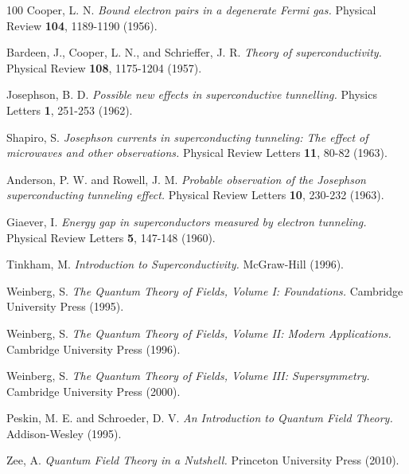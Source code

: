 \documentclass[11pt]{article}
\theoremstyle{definition}
\begin{document}
\begin{thebibliography}{100}
Cooper, L. N.
\textit{Bound electron pairs in a degenerate Fermi gas.}
Physical Review \textbf{104}, 1189-1190 (1956).

Bardeen, J., Cooper, L. N., and Schrieffer, J. R.
\textit{Theory of superconductivity.}
Physical Review \textbf{108}, 1175-1204 (1957).

Josephson, B. D.
\textit{Possible new effects in superconductive tunnelling.}
Physics Letters \textbf{1}, 251-253 (1962).

Shapiro, S.
\textit{Josephson currents in superconducting tunneling: The effect of microwaves and other observations.}
Physical Review Letters \textbf{11}, 80-82 (1963).

Anderson, P. W. and Rowell, J. M.
\textit{Probable observation of the Josephson superconducting tunneling effect.}
Physical Review Letters \textbf{10}, 230-232 (1963).

Giaever, I.
\textit{Energy gap in superconductors measured by electron tunneling.}
Physical Review Letters \textbf{5}, 147-148 (1960).

Tinkham, M.
\textit{Introduction to Superconductivity.}
McGraw-Hill (1996).

Weinberg, S.
\textit{The Quantum Theory of Fields, Volume I: Foundations.}
Cambridge University Press (1995).

Weinberg, S.
\textit{The Quantum Theory of Fields, Volume II: Modern Applications.}
Cambridge University Press (1996).

Weinberg, S.
\textit{The Quantum Theory of Fields, Volume III: Supersymmetry.}
Cambridge University Press (2000).

Peskin, M. E. and Schroeder, D. V.
\textit{An Introduction to Quantum Field Theory.}
Addison-Wesley (1995).

Zee, A.
\textit{Quantum Field Theory in a Nutshell.}
Princeton University Press (2010).
\end{thebibliography}
\end{document}
